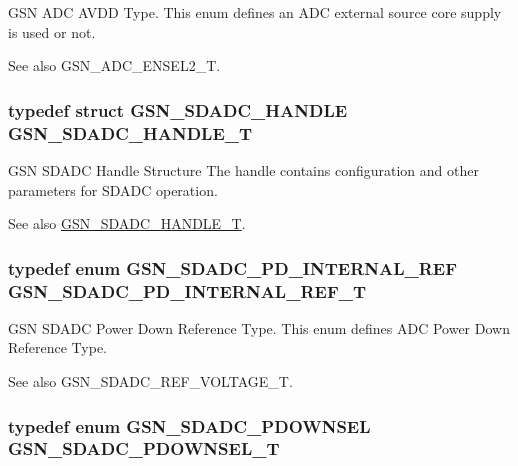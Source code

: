 GSN ADC AVDD Type. This enum defines an ADC external source core supply is used or not. 

\begin{DoxySeeAlso}{See also}
GSN\_\-ADC\_\-ENSEL2\_\-T. 
\end{DoxySeeAlso}
\hypertarget{a00652_ga1c9d36e9faa624275bd36abfa94ac41f}{
\subsubsection[{GSN\_\-SDADC\_\-HANDLE\_\-T}]{\setlength{\rightskip}{0pt plus 5cm}typedef struct {\bf GSN\_\-SDADC\_\-HANDLE} {\bf GSN\_\-SDADC\_\-HANDLE\_\-T}}}
\label{a00652_ga1c9d36e9faa624275bd36abfa94ac41f}


GSN SDADC Handle Structure The handle contains configuration and other parameters for SDADC operation. 

\begin{DoxySeeAlso}{See also}
\hyperlink{a00652_ga1c9d36e9faa624275bd36abfa94ac41f}{GSN\_\-SDADC\_\-HANDLE\_\-T}. 
\end{DoxySeeAlso}
\hypertarget{a00652_ga05b970e216458c5062bbef89f323a2cf}{
\subsubsection[{GSN\_\-SDADC\_\-PD\_\-INTERNAL\_\-REF\_\-T}]{\setlength{\rightskip}{0pt plus 5cm}typedef enum {\bf GSN\_\-SDADC\_\-PD\_\-INTERNAL\_\-REF}  {\bf GSN\_\-SDADC\_\-PD\_\-INTERNAL\_\-REF\_\-T}}}
\label{a00652_ga05b970e216458c5062bbef89f323a2cf}


GSN SDADC Power Down Reference Type. This enum defines ADC Power Down Reference Type. 

\begin{DoxySeeAlso}{See also}
GSN\_\-SDADC\_\-REF\_\-VOLTAGE\_\-T. 
\end{DoxySeeAlso}
\hypertarget{a00652_gaa6002bca137b8b6b143379be96c9564b}{
\subsubsection[{GSN\_\-SDADC\_\-PDOWNSEL\_\-T}]{\setlength{\rightskip}{0pt plus 5cm}typedef enum {\bf GSN\_\-SDADC\_\-PDOWNSEL} {\bf GSN\_\-SDADC\_\-PDOWNSEL\_\-T}}}
\label{a00652_gaa6002bca137b8b6b143379be96c9564b}



